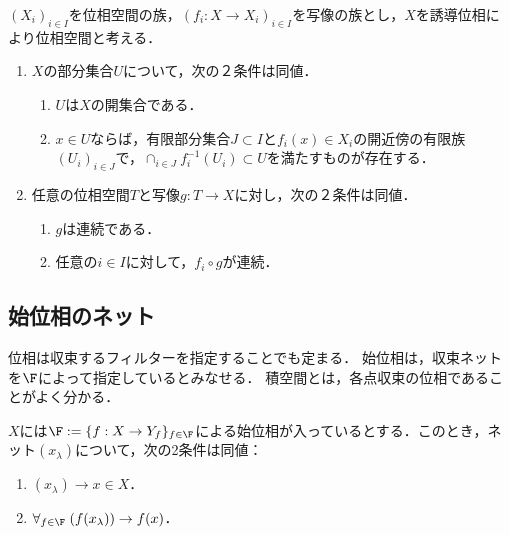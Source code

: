 \documentclass[uplatex,dvipdfmx]{jsreport}
\begin{document}
\begin{proposition}[誘導位相の普遍性]\label{prop-universality-of-final-topology}
    $(X_i)_{i\in I}$を位相空間の族，$(f_i:X\to X_i)_{i\in I}$を写像の族とし，$X$を誘導位相により位相空間と考える．
    \begin{enumerate}
        \item $X$の部分集合$U$について，次の２条件は同値．
        \begin{enumerate}[(1)]
            \item $U$は$X$の開集合である．
            \item $x\in U$ならば，有限部分集合$J\subset I$と$f_i(x)\in X_i$の開近傍の有限族$(U_i)_{i\in J}$で，$\cap_{i\in J}f^{-1}_i(U_i)\subset U$を満たすものが存在する．
        \end{enumerate}
        \item 任意の位相空間$T$と写像$g:T\to X$に対し，次の２条件は同値．
        \begin{enumerate}[(1)]
            \item $g$は連続である．
            \item 任意の$i\in I$に対して，$f_i\circ g$が連続．
        \end{enumerate}
    \end{enumerate}
\end{proposition}

\subsection{始位相のネット}

\begin{tcolorbox}[colframe=ForestGreen, colback=ForestGreen!10!white,breakable,colbacktitle=ForestGreen!40!white,coltitle=black,fonttitle=\bfseries\sffamily,
title=]
    位相は収束するフィルターを指定することでも定まる．
    始位相は，収束ネットを$\F$によって指定しているとみなせる．
    積空間とは，各点収束の位相であることがよく分かる．
\end{tcolorbox}

\begin{proposition}
    $X$には$\F:=\{f:X\to Y_f\}_{f\in\F}$による始位相が入っているとする．このとき，ネット$(x_\lambda)$について，次の2条件は同値：
    \begin{enumerate}
        \item $(x_\lambda)\to x\in X$．
        \item $\forall_{f\in\F}\;(f(x_\lambda))\to f(x)$．
    \end{enumerate}
\end{proposition}
\end{document}
